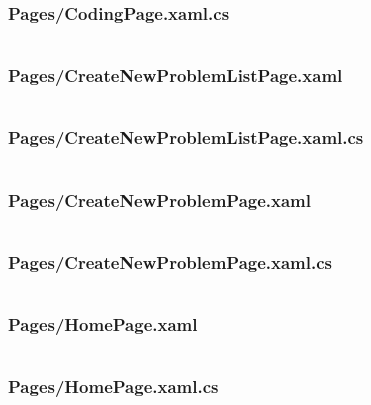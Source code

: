 \documentclass[a4paper]{report}
\begin{document}
\inputminted{xml}{"../src/Algorithm Dynamics/Pages/CodingPage.xaml"}

\subsubsection{Pages/CodingPage.xaml.cs}

\inputminted{csharp}{"../src/Algorithm Dynamics/Pages/CodingPage.xaml.cs"}

\subsubsection{Pages/CreateNewProblemListPage.xaml}

\inputminted{xml}{"../src/Algorithm Dynamics/Pages/CreateNewProblemListPage.xaml"}

\subsubsection{Pages/CreateNewProblemListPage.xaml.cs}
\label{subsubsec:createnewproblemlistpage
}

\inputminted{csharp}{"../src/Algorithm Dynamics/Pages/CreateNewProblemListPage.xaml.cs"}

\subsubsection{Pages/CreateNewProblemPage.xaml}

\inputminted{xml}{"../src/Algorithm Dynamics/Pages/CreateNewProblemPage.xaml"}

\subsubsection{Pages/CreateNewProblemPage.xaml.cs}

\inputminted{csharp}{"../src/Algorithm Dynamics/Pages/CreateNewProblemPage.xaml.cs"}

\subsubsection{Pages/HomePage.xaml}

\inputminted{xml}{"../src/Algorithm Dynamics/Pages/HomePage.xaml"}

\subsubsection{Pages/HomePage.xaml.cs}
\end{document}
